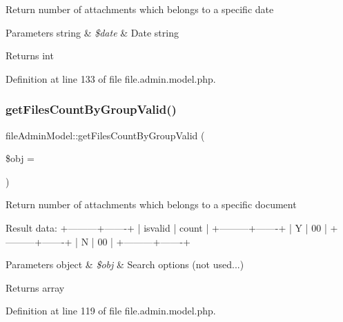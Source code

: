 Return number of attachments which belongs to a specific date


\begin{DoxyParams}[1]{Parameters}
string & {\em \$date} & Date string \\
\hline
\end{DoxyParams}
\begin{DoxyReturn}{Returns}
int 
\end{DoxyReturn}


Definition at line 133 of file file.\+admin.\+model.\+php.

\hypertarget{classfileAdminModel_aae3d004799fc86f576b61d96424fb1fa}{}\label{classfileAdminModel_aae3d004799fc86f576b61d96424fb1fa} 
\subsubsection{\texorpdfstring{get\+Files\+Count\+By\+Group\+Valid()}{getFilesCountByGroupValid()}}
{\footnotesize\ttfamily file\+Admin\+Model\+::get\+Files\+Count\+By\+Group\+Valid (\begin{DoxyParamCaption}\item[{}]{\$obj = {\ttfamily \textquotesingle{}\textquotesingle{}} }\end{DoxyParamCaption})}

Return number of attachments which belongs to a specific document


\begin{DoxyPre}
Result data:
+---------+-------+
| isvalid | count |
+---------+-------+
| Y       | 00    |
+---------+-------+
| N       | 00    |
+---------+-------+
\end{DoxyPre}



\begin{DoxyParams}[1]{Parameters}
object & {\em \$obj} & Search options (not used...) \\
\hline
\end{DoxyParams}
\begin{DoxyReturn}{Returns}
array 
\end{DoxyReturn}


Definition at line 119 of file file.\+admin.\+model.\+php.

\hypertarget{classfileAdminModel_a043ae7934f6fb3bb6ef24bff36a63795}{}\label{classfileAdminModel_a043ae7934f6fb3bb6ef24bff36a63795} 
